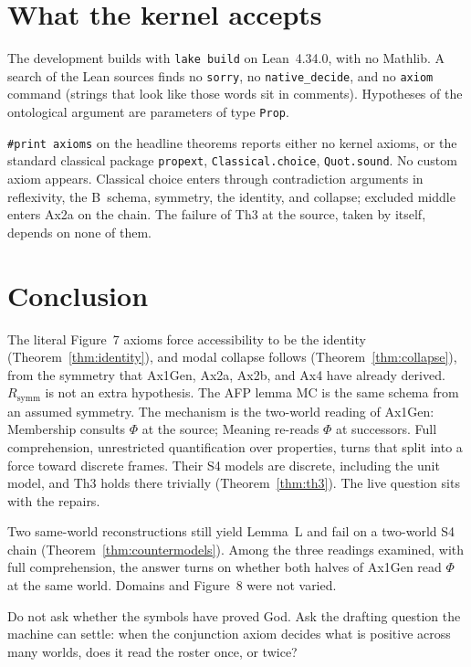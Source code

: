 \documentclass[11pt]{article}
\begin{document}
\section{What the kernel accepts}
\label{sec:kernel}

The development builds with \texttt{lake build} on Lean~4.34.0, with no Mathlib. A search of
the Lean sources finds no \texttt{sorry}, no \texttt{native\_decide}, and no \texttt{axiom}
command (strings that look like those words sit in comments). Hypotheses of the ontological
argument are parameters of type \texttt{Prop}.

\texttt{\#print axioms} on the headline theorems reports either no kernel axioms, or the
standard classical package \texttt{propext}, \texttt{Classical.choice}, \texttt{Quot.sound}.
No custom axiom appears. Classical choice enters through contradiction arguments in
reflexivity, the B~schema, symmetry, the identity, and collapse; excluded middle enters
Ax2a on the chain. The failure of Th3 at the source, taken by itself, depends on none of
them.

\section{Conclusion}

The literal Figure~7 axioms force accessibility to be the identity
(Theorem~\ref{thm:identity}), and modal collapse follows
(Theorem~\ref{thm:collapse}), from the symmetry that Ax1Gen, Ax2a, Ax2b, and Ax4
have already derived. \(R_{\mathrm{symm}}\) is not an extra hypothesis.
The AFP lemma MC is the same schema from an assumed symmetry.
The mechanism is the two-world reading of Ax1Gen: Membership
consults \(\Phi\) at the source; Meaning re-reads \(\Phi\) at successors. Full
comprehension, unrestricted quantification over properties, turns that split into a
force toward discrete frames. Their S4 models are discrete, including the unit model,
and Th3 holds there trivially (Theorem~\ref{thm:th3}).
The live question sits with the repairs.

Two same-world reconstructions still yield Lemma~L and fail on a two-world S4 chain
(Theorem~\ref{thm:countermodels}). Among the three readings examined, with full
comprehension, the answer turns on whether both halves of Ax1Gen read \(\Phi\) at the same
world. Domains and Figure~8 were not varied.

Do not ask whether the symbols have proved God. Ask the drafting question the machine can
settle: when the conjunction axiom decides what is positive across many worlds, does it
read the roster once, or twice?
\end{document}
